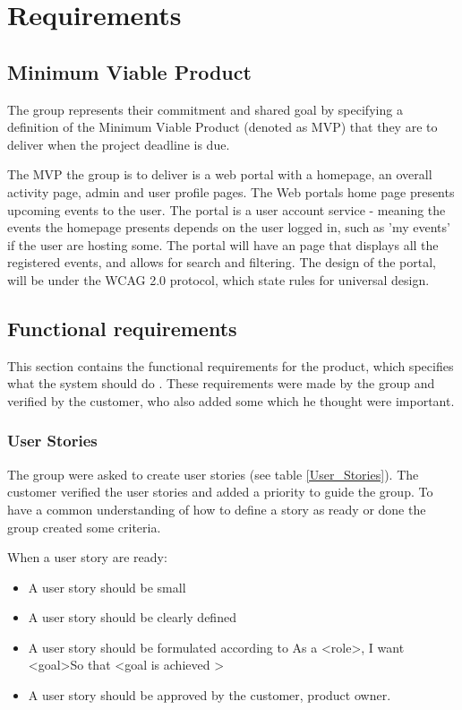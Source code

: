 
\chapter{Requirements}

\section{Minimum Viable Product}
\label{MVP}
The group represents their commitment and shared goal by specifying a definition of the Minimum Viable Product (denoted as MVP) that they are to deliver when the project deadline is due.

The MVP the group is to deliver is a web portal with a homepage, an overall activity page, admin and user profile pages. The Web portals home page presents upcoming events to the user. The portal is a user account service - meaning the events the homepage presents depends on the user logged in, such as 'my events'  if the user are hosting some. The portal will have an page that displays all the registered events, and allows for search and filtering. 
The design of the portal, will be under the WCAG 2.0 protocol, which state rules for universal design.

\section{Functional requirements}
This section contains the functional requirements for the product, which specifies what the system should do \cite{requirements}. These requirements were made by the group and verified by the customer, who also added some which he thought were important.

\subsection{User Stories}
\label{User stories}
The group were asked to create user stories (see table \ref{User_Stories}). The customer verified the user stories and added a priority to guide the group. To have a common understanding of how to define a story as ready or done the group created some criteria. 

\begin{description}
    \item[When a user story are ready:]
\end{description}
\begin{itemize}[noitemsep]
    \item A user story should be small
    \item A user story should be clearly defined
    \item A user story should be formulated according to As a \textless role\textgreater, I want \textless goal\textgreater So that \textless goal is achieved \textgreater
    \item A user story should be approved by the customer, product owner.
\end{itemize}

